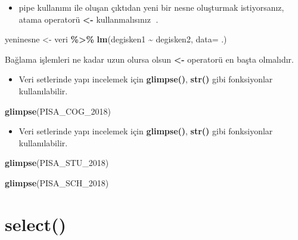 \documentclass[
  oneside]{book}
\newenvironment{Shaded}{\begin{snugshade}}{\end{snugshade}}
\newcommand{\AttributeTok}[1]{\textcolor[rgb]{0.13,0.29,0.53}{#1}}
\newcommand{\FunctionTok}[1]{\textcolor[rgb]{0.13,0.29,0.53}{\textbf{#1}}}
\newcommand{\NormalTok}[1]{#1}
\newcommand{\OtherTok}[1]{\textcolor[rgb]{0.56,0.35,0.01}{#1}}
\newcommand{\SpecialCharTok}[1]{\textcolor[rgb]{0.81,0.36,0.00}{\textbf{#1}}}
\providecommand{\tightlist}{%
  \setlength{\itemsep}{0pt}\setlength{\parskip}{0pt}}
\begin{document}
\begin{itemize}
\tightlist
\item
  pipe kullanımı ile oluşan çıktıdan yeni bir nesne oluşturmak istiyorsanız, atama operatorü \textbf{\textless-}
  kullanmalısınız 🔗.
\end{itemize}

\begin{Shaded}
\begin{Highlighting}[]
\NormalTok{yeninesne }\OtherTok{\textless{}{-}}\NormalTok{ veri }\SpecialCharTok{\%\textgreater{}\%} \FunctionTok{lm}\NormalTok{(degisken1 }\SpecialCharTok{\textasciitilde{}}\NormalTok{ degisken2, }\AttributeTok{data=}\NormalTok{ .)}
\end{Highlighting}
\end{Shaded}

Bağlama işlemleri ne kadar uzun olursa olsun \textbf{\textless-} operatorü en başta olmalıdır.

\begin{itemize}
\tightlist
\item
  Veri setlerinde yapı incelemek için \textbf{glimpse()}, \textbf{str()} gibi fonksiyonlar kullanılabilir.
\end{itemize}

\begin{Shaded}
\begin{Highlighting}[]
\FunctionTok{glimpse}\NormalTok{(PISA\_COG\_2018)}
\end{Highlighting}
\end{Shaded}

\begin{itemize}
\tightlist
\item
  Veri setlerinde yapı incelemek için \textbf{glimpse()}, \textbf{str()} gibi fonksiyonlar kullanılabilir.
\end{itemize}

\begin{Shaded}
\begin{Highlighting}[]
\FunctionTok{glimpse}\NormalTok{(PISA\_STU\_2018)}
\end{Highlighting}
\end{Shaded}

\begin{Shaded}
\begin{Highlighting}[]
\FunctionTok{glimpse}\NormalTok{(PISA\_SCH\_2018)}
\end{Highlighting}
\end{Shaded}

\hypertarget{select}{%
\section{\texorpdfstring{\textbf{select()}}{select()}}\label{select}}
\end{document}
